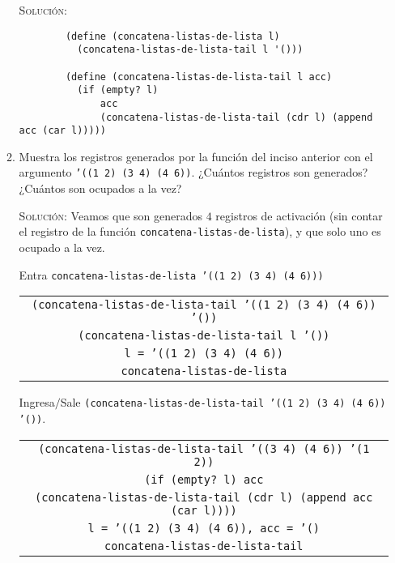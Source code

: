 \documentclass[letterpaper,11pt]{article}
\begin{document}
\begin{enumerate}
\begin{enumerate}
        \textsc{Solución:}
        \begin{verbatim}
        (define (concatena-listas-de-lista l)
          (concatena-listas-de-lista-tail l '()))
          
        (define (concatena-listas-de-lista-tail l acc)
          (if (empty? l)
              acc
              (concatena-listas-de-lista-tail (cdr l) (append acc (car l)))))
        \end{verbatim}

        \item Muestra los registros generados por la función del inciso anterior
        con el argumento \texttt{'((1 2) (3 4) (4 6))}. ¿Cuántos registros son
        generados? ¿Cuántos son ocupados a la vez?

        \textsc{Solución:} Veamos que son generados $4$ registros de activación
        (sin contar el registro de la función \texttt{concatena-listas-de-lista}), 
        y que solo uno es ocupado a la vez. 

        Entra \texttt{concatena-listas-de-lista '((1 2) (3 4) (4 6)))}
        \begin{center}
            \begin{tabular}{|c|}
                \hline
                \texttt{(concatena-listas-de-lista-tail 
                '((1 2) (3 4) (4 6)) '())} \\
                \texttt{(concatena-listas-de-lista-tail l '())} \\
                \texttt{l = '((1 2) (3 4) (4 6))} \\
                \texttt{concatena-listas-de-lista} \\
                \hline
            \end{tabular}
        \end{center}

        Ingresa$/$Sale \texttt{(concatena-listas-de-lista-tail 
        '((1 2) (3 4) (4 6)) '())}.
        \begin{center}
            \begin{tabular}[h]{|c|}
                \hline
                \texttt{(concatena-listas-de-lista-tail '((3 4) (4 6))
                '(1 2))} \\
                \texttt{(if (empty? l) acc} \\
                \texttt{(concatena-listas-de-lista-tail (cdr l) 
                (append acc (car l))))} \\
                \texttt{l = '((1 2) (3 4) (4 6)), acc = '()} \\
                \texttt{concatena-listas-de-lista-tail} \\
                \hline
            \end{tabular}
        \end{center}


\end{enumerate}
\end{enumerate}
\end{document}
